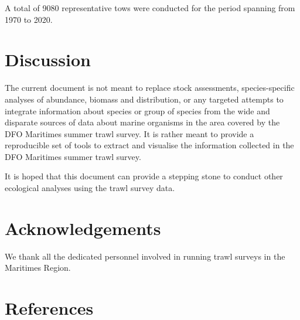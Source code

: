 \documentclass[12pt]{article}\usepackage[]{graphicx}\usepackage[]{color}
\begin{document}
A total of 9080 representative tows were conducted for the period spanning from 1970 to 2020.

\hypertarget{discussion}{%
\section{Discussion}\label{discussion}}

The current document is not meant to replace stock assessments, species-specific analyses of abundance, biomass and distribution, or any targeted attempts to integrate information about species or group of species from the wide and disparate sources of data about marine organisms in the area covered by the DFO Maritimes summer trawl survey. It is rather meant to provide a reproducible set of tools to extract and visualise the information collected in the DFO Maritimes summer trawl survey.

It is hoped that this document can provide a stepping stone to conduct other ecological analyses using the trawl survey data.

\hypertarget{acknowledgements}{%
\section{Acknowledgements}\label{acknowledgements}}

We thank all the dedicated personnel involved in running trawl surveys in the Maritimes Region.

\clearpage

\hypertarget{references}{%
\section{References}\label{references}}

\noindent \vspace{-2em} \setlength{\parindent}{-0.2in} \setlength{\leftskip}{0.2in} \setlength{\parskip}{8pt}
\end{document}
